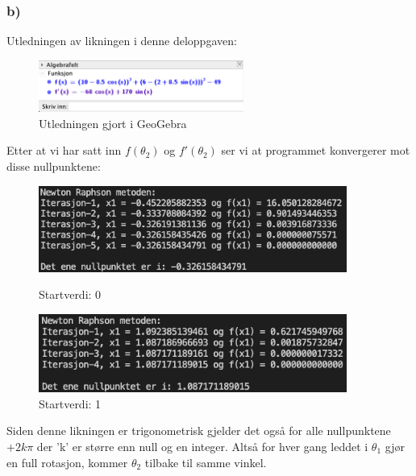 \newpage
\subsubsection{b)}
Utledningen av likningen i denne deloppgaven:

\begin{figure}[h!]
    \centering
    \includegraphics[width = 0.6\textwidth]{Figures/del2_2b_utledning.png}
    \caption{Utledningen gjort i GeoGebra}
    \label{fig:my_label}
\end{figure}

Etter at vi har satt inn $f(\theta_2)$ og $f'(\theta_2)$ ser vi at programmet konvergerer mot disse nullpunktene:

\begin{figure}[h!]
    \centering
    \begin{minipage}{0.45\textwidth}
        \centering
        \includegraphics[width=0.9\textwidth]{Figures/del2_2b_1.png}
        \caption{Startverdi: 0}
    \end{minipage}\hfill
    \begin{minipage}{0.45\textwidth}
        \centering
        \includegraphics[width=0.9\textwidth]{Figures/del2_2b_2.png}
        \caption{Startverdi: 1}
    \end{minipage}
\end{figure}

Siden denne likningen er trigonometrisk gjelder det også for alle nullpunktene $+2k\pi$ der 'k' er større enn null og en integer. Altså for hver gang leddet i $\theta_1$ gjør en full rotasjon, kommer $\theta_2$ tilbake til samme vinkel. %

